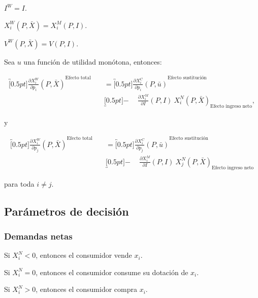 \documentclass[8pt,a4paper]{extarticle}
\begin{document}
\begin{multicols}{3}
\begin{eqlist}
\item $ \displaystyle I^W = I$.
\item $X^W_i (P, \bar{X}) = X^M_i (P, I)$.
\item $V^W(P, \bar{X}) = V(P, I)$.
\end{eqlist}

\begin{boxtheo}
	Sea $u$ una función de utilidad monótona, entonces:
	
	\begin{equation*}
	\begin{aligned}
		\overbracket[0.5pt]{\frac{\partial X^W_i}{\partial p_i} (P, \bar{X})}^{\text{Efecto total}} \quad &= \overbracket[0.5pt]{\frac{\partial X^C_i}{\partial p_i} (P, \bar{u})}^{\text{Efecto sustitución}} \\
																						   & \underbracket[0.5pt]{ - \quad\ \frac{\partial X_i^M}{\partial I} (P, I)\ X^N_i (P,\bar{X})}_{\text{Efecto ingreso neto}},
	\end{aligned}
	\end{equation*}
	
	y
	
	\begin{equation*}
	\begin{aligned}
		\overbracket[0.5pt]{\frac{\partial X^W_i}{\partial p_j} (P, \bar{X})}^{\text{Efecto total}} \quad &= \overbracket[0.5pt]{\frac{\partial X^C_i}{\partial p_j} (P, \bar{u})}^{\text{Efecto sustitución}} \\
																						   & \underbracket[0.5pt]{ - \quad\ \frac{\partial X_i^M}{\partial I} (P, I)\ X^N_j (P,\bar{X})}_{\text{Efecto ingreso neto}}
	\end{aligned}
	\end{equation*} 

	para toda $i \neq j$.
\end{boxtheo}

\subsection{Parámetros de decisión}

\subsubsection*{Demandas netas}

\begin{eqlist}
\item Si $X_i^N < 0$, entonces el consumidor vende $x_i$.
\item Si $X_i^N = 0$, entonces el consumidor consume su dotación de $x_i$.
\item Si $X_i^N > 0$, entonces el consumidor compra $x_i$.
\end{eqlist}


\end{multicols}
\end{document}

